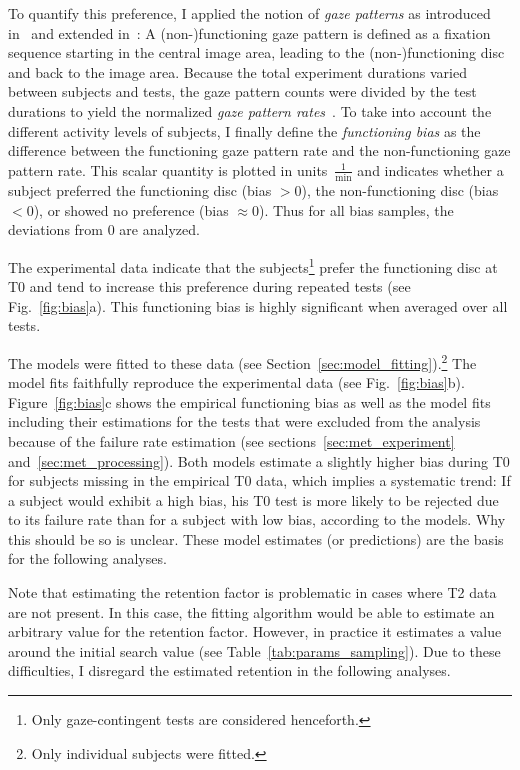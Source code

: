 \documentclass[a4paper]{scrreprt}
\begin{document}
To quantify this preference, I applied the notion of \textit{gaze patterns} as introduced in~\cite{wang12} and extended in~\cite{kolling17}: A (non-)functioning gaze pattern is defined as a fixation sequence starting in the central image area, leading to the (non-)functioning disc and back to the image area. Because the total experiment durations varied between subjects and tests, the gaze pattern counts were divided by the test durations to yield the normalized \textit{gaze pattern rates}~\cite{kolling17}. To take into account the different activity levels of subjects, I finally define the \textit{functioning bias} as the difference between the functioning gaze pattern rate and the non-functioning gaze pattern rate. This scalar quantity is plotted in units~$\frac{1}{\text{min}}$ and indicates whether a subject preferred the functioning disc (bias $>0$), the non-functioning disc (bias $<0$), or showed no preference (bias $\approx 0$). Thus for all bias samples, the deviations from 0 are analyzed.

The experimental data indicate that the subjects\footnote{Only gaze-contingent tests are considered henceforth.} prefer the functioning disc at T0 and tend to increase this preference during repeated tests (see Fig.~\ref{fig:bias}a). This functioning bias is highly significant when averaged over all tests.

The models were fitted to these data (see Section~\ref{sec:model_fitting}).\footnote{Only individual subjects were fitted.} The model fits faithfully reproduce the experimental data (see Fig.~\ref{fig:bias}b). Figure~\ref{fig:bias}c shows the empirical functioning bias as well as the model fits including their estimations for the tests that were excluded from the analysis because of the failure rate estimation (see sections~\ref{sec:met_experiment} and~\ref{sec:met_processing}). Both models estimate a slightly higher bias during T0 for subjects missing in the empirical T0 data, which implies a systematic trend: If a subject would exhibit a high bias, his T0 test is more likely to be rejected due to its failure rate than for a subject with low bias, according to the models. Why this should be so is unclear. These model estimates (or predictions) are the basis for the following analyses. 

Note that estimating the retention factor is problematic in cases where T2 data are not present. In this case, the fitting algorithm would be able to estimate an arbitrary value for the retention factor. However, in practice it estimates a value around the initial search value (see Table~\ref{tab:params_sampling}). Due to these difficulties, I disregard the estimated retention in the following analyses.
\end{document}
